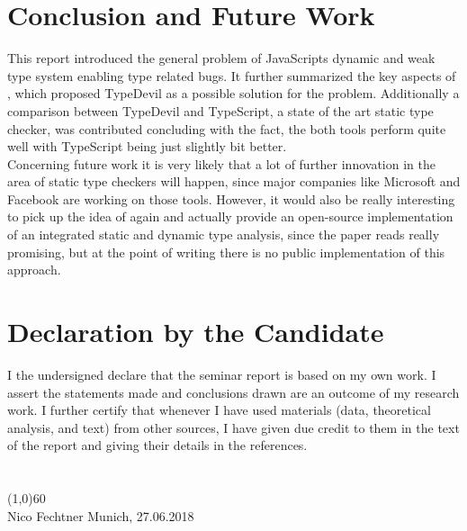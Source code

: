 \documentclass[runningheads,a4paper]{llncs}
\begin{document}
\section{Conclusion and Future Work}
This report introduced the general problem of JavaScripts dynamic and weak type system enabling type related bugs.
It further summarized the key aspects of \cite{DBLP:conf/icse/PradelSS15}, which proposed TypeDevil as a possible solution for the problem.
Additionally a comparison between TypeDevil and TypeScript, a state of the art static type checker, was contributed concluding with the fact, the both tools perform quite well with TypeScript being just slightly bit better.\\
Concerning future work it is very likely that a lot of further innovation in the area of static type checkers will happen, since major companies like Microsoft and Facebook are working on those tools.
However, it would also be really interesting to pick up the idea of \cite{DBLP:conf/icse/TanXCLYS17} again and actually provide an open-source implementation of an integrated static and dynamic type analysis, since the paper reads really promising, but at the point of writing there is no public implementation of this approach.  


\newpage

{}


\newpage

\section*{Declaration by the Candidate}
I the undersigned declare that the seminar report is based on my own work.
I assert the statements made and conclusions drawn are an outcome of my research work. I further certify that whenever I have used materials (data, theoretical analysis, and text) from other sources, I have given due credit to them in the text of the report and giving their details in the references.
\\ \\ \\
\line(1,0){60}\\
Nico Fechtner
\hfill
Munich, 27.06.2018
\end{document}
